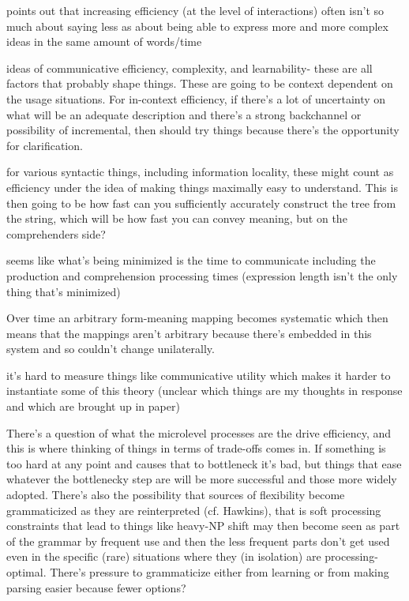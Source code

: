 \documentclass[]{article}
\begin{document}
\cite{hawkins2021} points out that increasing efficiency (at the level of interactions) often isn't so much about saying less as about being able to express more and more complex ideas in the same amount of words/time 

\cite{gibson2019} ideas of communicative efficiency, complexity, and learnability- these are all factors that probably shape things. These are going to be context dependent on the usage situations. For in-context efficiency, if there's a lot of uncertainty on what will be an adequate description and there's a strong backchannel or possibility of incremental, then should try things because there's the opportunity for clarification. 

\cite{gibson2019} for various syntactic things, including information locality, these might count as efficiency under the idea of making things maximally easy to understand. This is then going to be how fast can you sufficiently accurately construct the tree from the string, which will be how fast you can convey meaning, but on the comprehenders side? 

seems like what's being minimized is the time to communicate including the production and comprehension processing times (expression length isn't the only thing that's minimized)

Over time an arbitrary form-meaning mapping becomes systematic which then means that the mappings aren't arbitrary because there's embedded in this system and so couldn't change unilaterally. 

\cite{gibson2019} it's hard to measure things like communicative utility which makes it harder to instantiate some of this theory (unclear which things are my thoughts in response and which are brought up in paper) 



There's a question of what the microlevel processes are the drive efficiency, and this is where thinking of things in terms of trade-offs comes in. If something is too hard at any point and causes that to bottleneck it's bad, but things that ease whatever the bottlenecky step are will be more successful and those more widely adopted. There's also the possibility that sources of flexibility become grammaticized as they are reinterpreted (cf. Hawkins), that is soft processing constraints that lead to things like heavy-NP shift may then become seen as part of the grammar by frequent use and then the less frequent parts don't get used even in the specific (rare) situations where they (in isolation) are processing-optimal. There's pressure to grammaticize either from learning or from making parsing easier because fewer options? 
\end{document}
